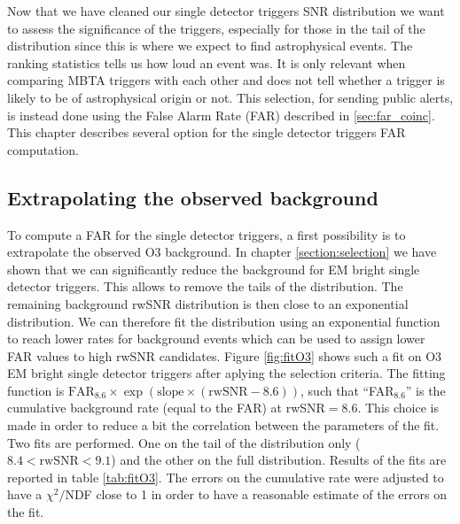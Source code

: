 
Now that we have cleaned our single detector triggers SNR distribution we want to assess the significance of the triggers, especially for those in the tail of the distribution since this is where we expect to find astrophysical events.
The ranking statistics tells us how loud an event was.
It is only relevant when comparing MBTA triggers with each other and does not tell whether a trigger is likely to be of astrophysical origin or not.
This selection, for sending public alerts, is instead done using the False Alarm Rate (FAR) described in \ref{sec:far_coinc}.
This chapter describes several option for the single detector triggers FAR computation.


\subsection{Extrapolating the observed background}

To compute a FAR for the single detector triggers, a first possibility is to extrapolate the observed O3 background.
In chapter \ref{section:selection} we have shown that we can significantly reduce the background for EM bright single detector triggers.
This allows to remove the tails of the distribution.
The remaining background rwSNR distribution is then close to an exponential distribution.
We can therefore fit the distribution using an exponential function to reach lower rates for background events which can be used to assign lower FAR values to high rwSNR candidates.
Figure \ref{fig:fitO3} shows such a fit on O3 EM bright single detector triggers after aplying the selection criteria.
The fitting function is $\textrm{FAR$_{8.6}$} \times \exp(\textrm{slope} \times (\textrm{rwSNR}-8.6))$, such that ``FAR$_{8.6}$'' is the cumulative background rate (equal to the FAR) at rwSNR$=8.6$.
This choice is made in order to reduce a bit the correlation between the parameters of the fit.
Two fits are performed.
One on the tail of the distribution only ($8.4<\text{rwSNR}<9.1$) and the other on the full distribution.
Results of the fits are reported in table \ref{tab:fitO3}.
The errors on the cumulative rate were adjusted to have a $\chi^2/$NDF close to 1 in order to have a reasonable estimate of the errors on the fit.

